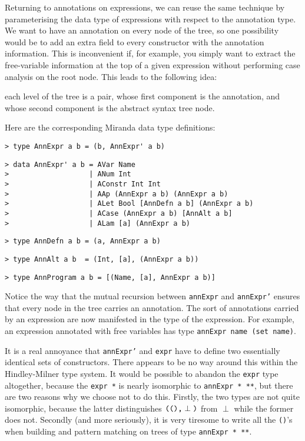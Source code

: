 Returning to annotations on expressions, we can reuse the same
technique by parameterising the data type of expressions with respect
to the annotation type.  We want to have an annotation on every node
of the tree, so one possibility would be to add an extra field to
every constructor with the annotation information.  This is
inconvenient if, for example, you simply want to extract the
free-variable information at the top of a given expression without
performing case analysis on the root node.  This leads to the
following idea:
\begin{important}
each level of the tree is a pair, whose first
component is the annotation, and whose second component is the
abstract syntax tree node.
\end{important}
Here are the corresponding Miranda data type definitions:
\begin{verbatim}
> type AnnExpr a b = (b, AnnExpr' a b)
\end{verbatim}
%
\begin{verbatim}
> data AnnExpr' a b = AVar Name
>                   | ANum Int
>                   | AConstr Int Int
>                   | AAp (AnnExpr a b) (AnnExpr a b)
>                   | ALet Bool [AnnDefn a b] (AnnExpr a b)
>                   | ACase (AnnExpr a b) [AnnAlt a b]
>                   | ALam [a] (AnnExpr a b)
\end{verbatim}
%
%
%
%
%
%
%
\begin{verbatim}
> type AnnDefn a b = (a, AnnExpr a b)
\end{verbatim}
%
\begin{verbatim}
> type AnnAlt a b  = (Int, [a], (AnnExpr a b))
\end{verbatim}
%
\begin{verbatim}
> type AnnProgram a b = [(Name, [a], AnnExpr a b)]
\end{verbatim}
%

Notice the way that the mutual recursion between \mbox{\tt annExpr} and
\mbox{\tt annExpr'} ensures that every node in the tree carries an annotation.
The sort of annotations carried by an expression are now manifested in
the type of the expression.  For example, an expression annotated with
free variables has type \mbox{\tt annExpr\ name\ (set\ name)}.

It is a real annoyance that \mbox{\tt annExpr'} and \mbox{\tt expr} have to define two
essentially identical sets of constructors.  There appears to be no
way around this within the Hindley-Milner type system.  It would be
possible to abandon the \mbox{\tt expr} type altogether, because the \mbox{\tt expr\ *}
is nearly isomorphic to \mbox{\tt annExpr\ *\ **}, but there are two reasons why
we choose not to do this.  Firstly, the two types are not quite
isomorphic, because the latter distinguishes $\mbox{\tt ((),}\perp\mbox{\tt )}$ from
$\perp$ while the former does not. Secondly (and more seriously), it
is very tiresome to write all the \mbox{\tt ()}'s when building and
pattern matching on trees of type \mbox{\tt annExpr\ *\ **}.

